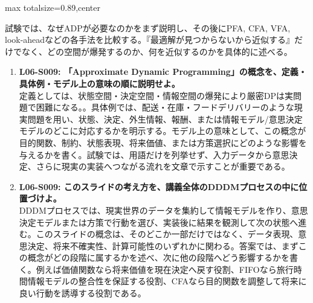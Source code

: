 \begin{minipage}[t]{0.58\textwidth}
\begin{adjustbox}{max totalsize={\textwidth}{0.89\textheight},center}
\begin{minipage}{\textwidth}
試験では、なぜADPが必要なのかをまず説明し、その後にPFA, CFA, VFA, look-aheadなどの各手法を比較する。『最適解が見つからないから近似する』だけでなく、どの空間が爆発するのか、何を近似するのかを具体的に述べる。\par{}\begin{enumerate}\item \textbf{L06-S009: 「Approximate Dynamic Programming」の概念を、定義・具体例・モデル上の意味の順に説明せよ。}\\定義としては、状態空間・決定空間・情報空間の爆発により厳密DPは実問題で困難になる。。具体例では、配送・在庫・フードデリバリーのような現実問題を用い、状態、決定、外生情報、報酬、または情報モデル/意思決定モデルのどこに対応するかを明示する。モデル上の意味として、この概念が目的関数、制約、状態表現、将来価値、または方策選択にどのような影響を与えるかを書く。試験では、用語だけを列挙せず、入力データから意思決定、さらに現実の実装へつながる流れを文章で示すことが重要である。\item \textbf{L06-S009: このスライドの考え方を、講義全体のDDDMプロセスの中に位置づけよ。}\\DDDMプロセスでは、現実世界のデータを集約して情報モデルを作り、意思決定モデルまたは方策で行動を選び、実装後に結果を観測して次の状態へ進む。このスライドの概念は、そのどこか一部だけではなく、データ表現、意思決定、将来不確実性、計算可能性のいずれかに関わる。答案では、まずこの概念がどの段階に属するかを述べ、次に他の段階へどう影響するかを書く。例えば価値関数なら将来価値を現在決定へ戻す役割、FIFOなら旅行時間情報モデルの整合性を保証する役割、CFAなら目的関数を調整して将来に良い行動を誘導する役割である。\end{enumerate}
\end{minipage}
\end{adjustbox}
\end{minipage}


